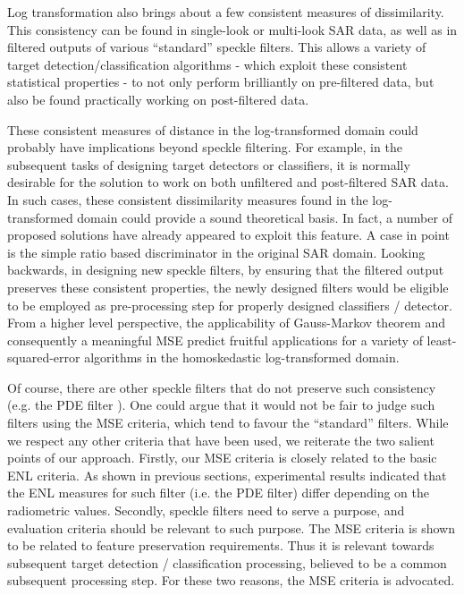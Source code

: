 Log transformation also brings about a few consistent measures of dissimilarity.
	This consistency can be found in single-look or multi-look SAR data, 
	as well as in filtered outputs of various ``standard'' speckle filters.
This allows a variety of target detection/classification algorithms
  - which exploit these consistent statistical properties -
  to not only perform brilliantly on pre-filtered data,
  but also be found practically working on post-filtered data.
        
These consistent measures of distance in the log-transformed domain could probably have implications beyond speckle filtering.
For example, in the subsequent tasks of designing target detectors or classifiers,
  it is normally desirable for the solution to work on both unfiltered and post-filtered SAR data.
In such cases, these consistent dissimilarity measures found in the log-transformed domain could provide a sound theoretical
	basis. In fact, a number of proposed solutions have already appeared to exploit this feature. 
A case in point is the simple ratio based discriminator in the original SAR domain.
Looking backwards, in designing new speckle filters,
  by ensuring that the filtered output preserves these consistent properties,
	the newly designed filters would be eligible to be employed as pre-processing step for properly designed classifiers / detector.
From a higher level perspective, the applicability of Gauss-Markov theorem and consequently a meaningful MSE 
  predict fruitful applications for a variety of least-squared-error algorithms in the homoskedastic log-transformed domain.
        
Of course, there are other speckle filters that do not preserve such consistency 
	(e.g. the PDE filter \cite{You_TIP_2000}). One could argue that it would not be fair to judge such filters 
	using the MSE criteria, which tend to favour the ``standard'' filters.
While we respect any other criteria that have been used, we reiterate the two salient points of our approach. 
Firstly, our MSE criteria is closely related to the basic ENL criteria.
As shown in previous sections, experimental results indicated that
  the ENL measures for such filter (i.e. the PDE filter) differ depending  on the radiometric values. 
Secondly, speckle filters need to serve a purpose, and evaluation criteria should be relevant to such purpose.
The MSE criteria is shown to be related to feature preservation requirements.
Thus it is relevant towards subsequent target detection / classification processing, 
	believed to be a common subsequent processing step. 
For these two reasons, the MSE criteria is advocated.

